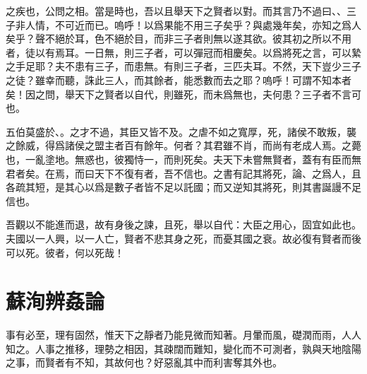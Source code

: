 之疾也，公問之相。當是時也，吾以且舉天下之賢者以對。而其言乃不過曰、、三子非人情，不可近而已。嗚呼！以爲果能不用三子矣乎？與處幾年矣，亦知之爲人矣乎？聲不絕於耳，色不絕於目，而非三子者則無以遂其欲。彼其初之所以不用者，徒以有焉耳。一日無，則三子者，可以彈冠而相慶矣。以爲將死之言，可以縶之手足耶？夫不患有三子，而患無。有則三子者，三匹夫耳。不然，天下豈少三子之徒？雖幸而聽，誅此三人，而其餘者，能悉數而去之耶？嗚呼！可謂不知本者矣！因之問，舉天下之賢者以自代，則雖死，而未爲無也，夫何患？三子者不言可也。

五伯莫盛於、。之才不過，其臣又皆不及。之虐不如之寬厚，死，諸侯不敢叛，襲之餘威，得爲諸侯之盟主者百有餘年。何者？其君雖不肖，而尚有老成人焉。之薨也，一亂塗地。無惑也，彼獨恃一，而則死矣。夫天下未嘗無賢者，蓋有有臣而無君者矣。在焉，而曰天下不復有者，吾不信也。之書有記其將死，論、之爲人，且各疏其短，是其心以爲是數子者皆不足以託國；而又逆知其將死，則其書誕謾不足信也。

吾觀以不能進而退，故有身後之諫，且死，舉以自代：大臣之用心，固宜如此也。夫國以一人興，以一人亡，賢者不悲其身之死，而憂其國之衰。故必復有賢者而後可以死。彼者，何以死哉！

\theendnotes

\section[辨姦論\quad{\small 蘇洵}]{{\normalsize 蘇洵}\quad 辨姦論}
事有必至，理有固然，惟天下之靜者乃能見微而知著。月暈而風，礎潤而雨，人人知之。人事之推移，理勢之相因，其疎闊而難知，變化而不可測者，孰與天地陰陽之事，而賢者有不知，其故何也？好惡亂其中而利害奪其外也。

